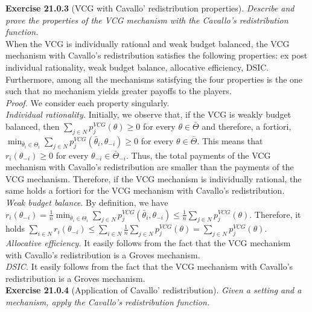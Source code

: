 \textbf{Exercise 21.0.3} (VCG with Cavallo’ redistribution properties). \textit{Describe and prove the properties of the VCG mechanism with the Cavallo’s redistribution function.}\\

When the VCG is individually rational and weak budget balanced, the VCG mechanism with Cavallo's redistribution satisfies the following properties: ex post individual rationality, weak budget balance, allocative efficiency, DSIC. Furthermore, among all the mechanisms satisfying the four properties is the one such that no mechanism yields greater payoffs to the players.\\
\textit{Proof.} We consider each property singularly.\\
\textit{Individual rationality.} Initially, we observe that, if the VCG is weakly budget balanced, then $\sum_{j \in N} p_{j}^{V C G}(\theta) \geqslant 0$ for every $\theta \in \bar{\Theta}$ and therefore, a fortiori, $\min _{\bar{\theta}_{i} \in \Theta_{i}} \sum_{j \in N} p_{j}^{V C G}\left(\bar{\theta}_{i}, \theta_{-i}\right) \geqslant 0$ for every $\theta \in \bar{\Theta} .$ This means that $r_{i}\left(\theta_{-i}\right) \geqslant 0$
for every $\theta_{-i} \in \bar{\Theta}_{-i} .$ Thus, the total payments of the VCG mechanism with Cavallo's redistribution are smaller than the payments of the VCG mechanism. Therefore, if the VCG mechanism is individually rational, the same holds a fortiori for the VCG mechanism with Cavallo's redistribution.\\
\textit{Weak budget balance}. By definition, we have $r_{i}\left(\theta_{-i}\right)=\frac{1}{n} \min _{\bar{\theta}_{i} \in \Theta_{i}} \sum_{j \in N} p_{j}^{V C G}\left(\bar{\theta}_{i}, \theta_{-i}\right) \leqslant \frac{1}{n} \sum_{j \in N} p_{j}^{V C G}(\theta) .$ Therefore,
it holds $\sum_{i \in N} r_{i}\left(\theta_{-i}\right) \leqslant \sum_{i \in N} \frac{1}{n} \sum_{j \in N} p_{j}^{V C G}(\theta)=\sum_{j \in N} p_{j}^{V C G}(\theta)$.\\
\textit{Allocative efficiency.} It easily follows from the fact that the VCG mechanism with Cavallo's redistribution is a Groves mechanism.\\
\textit{DSIC.} It easily follows from the fact that the VCG mechanism with Cavallo's redistribution is a Groves mechanism.\\

\textbf{Exercise 21.0.4} (Application of Cavallo’ redistribution). \textit{Given a setting and a mechanism, apply the Cavallo’s redistribution function.}\\

